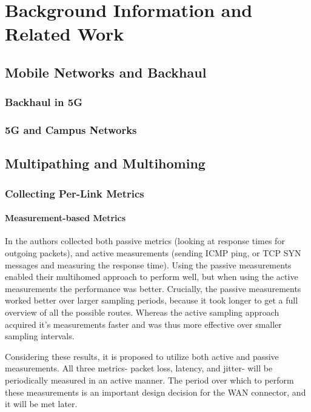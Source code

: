 
\cleardoublepage
\chapter{Background Information and Related Work}
\label{cha:background}

\section{Mobile Networks and Backhaul}

\subsection{Backhaul in 5G}

\subsection{5G and Campus Networks}


\section{Multipathing and Multihoming}

\subsection{Collecting Per-Link Metrics}

\subsubsection{Measurement-based Metrics}

In \cite{akella2008performance} the authors collected both passive metrics (looking at response times for outgoing packets), and active measurements (sending ICMP ping, or TCP SYN messages and measuring the response time). Using the passive measurements enabled their multihomed approach to perform well, but when using the active measurements the performance was better. Crucially, the passive measurements worked better over larger sampling periods, because it took longer to get a full overview of all the possible routes. Whereas the active sampling approach acquired it's measurements faster and was thus more effective over smaller sampling intervals.

Considering these results, it is proposed to utilize both active and passive measurements. All three metrics- packet loss, latency, and jitter- will be periodically measured in an active manner. The period over which to perform these measurements is an important design decision for the WAN connector, and it will be met later.

